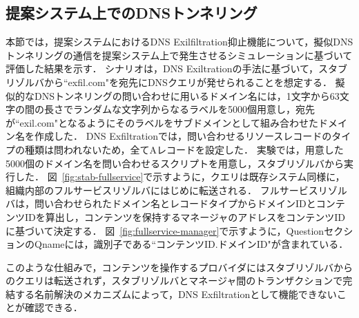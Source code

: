 \subsection{提案システム上でのDNSトンネリング}
\label{sec:eval-tunnel}
本節では，提案システムにおけるDNS Exilfiltration抑止機能について，擬似DNSトンネリングの通信を提案システム上で発生させるシミュレーションに基づいて評価した結果を示す．
シナリオは，DNS Exiltrationの手法に基づいて，スタブリゾルバから``exfil.com"を宛先にDNSクエリが発せられることを想定する．
擬似的なDNSトンネリングの問い合わせに用いるドメイン名には，1文字から63文字の間の長さでランダムな文字列からなるラベルを5000個用意し，宛先が``exil.com"となるようにそのラベルをサブドメインとして組み合わせたドメイン名を作成した．
DNS Exfiltrationでは，問い合わせるリソースレコードのタイプの種類は問われないため，全てAレコードを設定した．
実験では，用意した5000個のドメイン名を問い合わせるスクリプトを用意し，スタブリゾルバから実行した．
図~\ref{fig:stab-fullservice}で示すように，クエリは既存システム同様に，組織内部のフルサービスリゾルバにはじめに転送される．
フルサービスリゾルバは，問い合わせられたドメイン名とレコードタイプからドメインIDとコンテンツIDを算出し，コンテンツを保持するマネージャのアドレスをコンテンツIDに基づいて決定する．
図~\ref{fig:fullservice-manager}で示すように，QuestionセクションのQnameには，識別子である``コンテンツID.ドメインID"が含まれている．

このような仕組みで，コンテンツを操作するプロバイダにはスタブリゾルバからのクエリは転送されず，スタブリゾルバとマネージャ間のトランザクションで完結する名前解決のメカニズムによって，DNS Exfiltrationとして機能できないことが確認できる．

